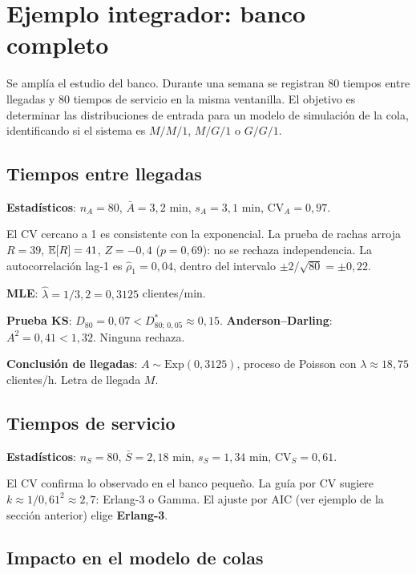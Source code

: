 \documentclass[11pt, letterpaper]{article}
\begin{document}
\section{Ejemplo integrador: banco completo}

\begin{ejemplobox}[Sistema]
Se amplía el estudio del banco. Durante una semana se registran 80 tiempos entre llegadas y 80 tiempos de servicio en la misma ventanilla. El objetivo es determinar las distribuciones de entrada para un modelo de simulación de la cola, identificando si el sistema es $M/M/1$, $M/G/1$ o $G/G/1$.
\end{ejemplobox}

\subsection{Tiempos entre llegadas}

\textbf{Estadísticos}: $n_A = 80$, $\bar A = 3{,}2$ min, $s_A = 3{,}1$ min, $\text{CV}_A = 0{,}97$.

El CV cercano a 1 es consistente con la exponencial. La prueba de rachas arroja $R=39$, $\mathbb{E}[R]=41$, $Z = -0{,}4$ ($p=0{,}69$): no se rechaza independencia. La autocorrelación lag-1 es $\hat\rho_1 = 0{,}04$, dentro del intervalo $\pm 2/\sqrt{80} = \pm 0{,}22$.

\textbf{MLE}: $\hat\lambda = 1/3{,}2 = 0{,}3125$ clientes/min.

\textbf{Prueba KS}: $D_{80} = 0{,}07 < D^*_{80;\,0{,}05}\approx 0{,}15$. \textbf{Anderson--Darling}: $A^2 = 0{,}41 < 1{,}32$. Ninguna rechaza.

\textbf{Conclusión de llegadas}: $A \sim \text{Exp}(0{,}3125)$, proceso de Poisson con $\lambda \approx 18{,}75$ clientes/h. Letra de llegada $M$.

\subsection{Tiempos de servicio}

\textbf{Estadísticos}: $n_S = 80$, $\bar S = 2{,}18$ min, $s_S = 1{,}34$ min, $\text{CV}_S = 0{,}61$.

El CV confirma lo observado en el banco pequeño. La guía por CV sugiere $k \approx 1/0{,}61^2 \approx 2{,}7$: Erlang-3 o Gamma. El ajuste por AIC (ver ejemplo de la sección anterior) elige \textbf{Erlang-3}.

\subsection{Impacto en el modelo de colas}
\end{document}
